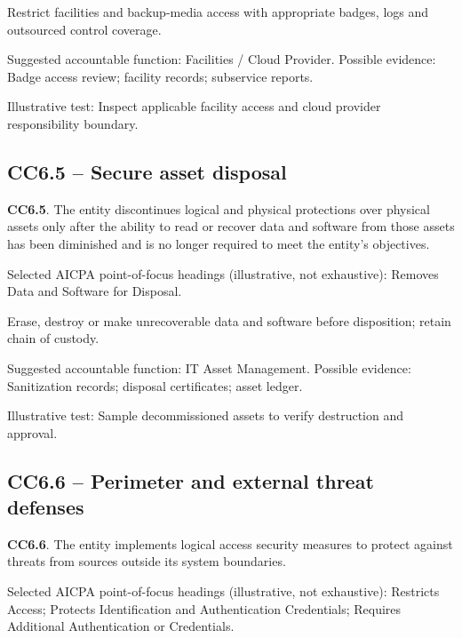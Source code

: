\documentclass[10pt,oneside]{report}
\begin{document}
\begin{engineeringbox}
Restrict facilities and backup-media access with appropriate badges, logs and outsourced control coverage.
\end{engineeringbox}
Suggested accountable function: Facilities / Cloud Provider. Possible evidence: Badge access review; facility records; subservice reports.

Illustrative test: Inspect applicable facility access and cloud provider responsibility boundary.

\subsection*{CC6.5 -- Secure asset disposal}
\begin{aicpabox}
\textbf{CC6.5}. The entity discontinues logical and physical protections over physical assets only after the ability to read or recover data and software from those assets has been diminished and is no longer required to meet the entity's objectives.\par{}
\end{aicpabox}
Selected AICPA point-of-focus headings (illustrative, not exhaustive): Removes Data and Software for Disposal.

\begin{engineeringbox}
Erase, destroy or make unrecoverable data and software before disposition; retain chain of custody.
\end{engineeringbox}
Suggested accountable function: IT Asset Management. Possible evidence: Sanitization records; disposal certificates; asset ledger.

Illustrative test: Sample decommissioned assets to verify destruction and approval.

\subsection*{CC6.6 -- Perimeter and external threat defenses}
\begin{aicpabox}
\textbf{CC6.6}. The entity implements logical access security measures to protect against threats from sources outside its system boundaries.\par{}
\end{aicpabox}
Selected AICPA point-of-focus headings (illustrative, not exhaustive): Restricts Access; Protects Identification and Authentication Credentials; Requires Additional Authentication or Credentials.
\end{document}
